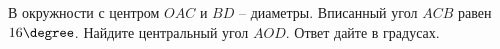 \begin{ex}
	\begin{condition}
		В окружности с центром \( O AC \) и \( BD \) – диаметры. Вписанный угол \( ACB \)  равен \( 16 \degree \). Найдите центральный угол \( AOD \). Ответ дайте в градусах.
	\end{condition}
\end{ex}